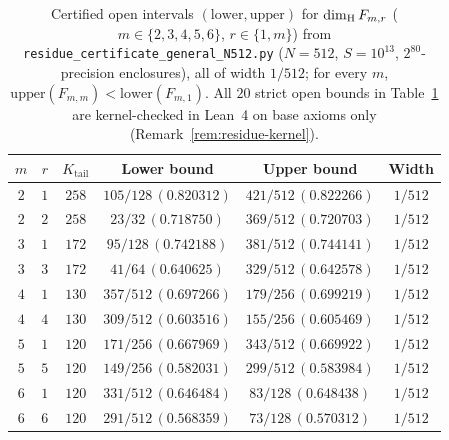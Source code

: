 \begin{table}[ht]
\centering\small
\begin{tabular}{c|c|c|c|c|c}
$m$ & $r$ & $K_{\mathrm{tail}}$ & Lower bound & Upper bound & Width \\\hline
$2$ & $1$ & $258$ & $105/128\,(0.820312)$ & $421/512\,(0.822266)$ & $1/512$ \\
$2$ & $2$ & $258$ & $23/32\,(0.718750)$ & $369/512\,(0.720703)$ & $1/512$ \\\hline
$3$ & $1$ & $172$ & $95/128\,(0.742188)$ & $381/512\,(0.744141)$ & $1/512$ \\
$3$ & $3$ & $172$ & $41/64\,(0.640625)$ & $329/512\,(0.642578)$ & $1/512$ \\\hline
$4$ & $1$ & $130$ & $357/512\,(0.697266)$ & $179/256\,(0.699219)$ & $1/512$ \\
$4$ & $4$ & $130$ & $309/512\,(0.603516)$ & $155/256\,(0.605469)$ & $1/512$ \\\hline
$5$ & $1$ & $120$ & $171/256\,(0.667969)$ & $343/512\,(0.669922)$ & $1/512$ \\
$5$ & $5$ & $120$ & $149/256\,(0.582031)$ & $299/512\,(0.583984)$ & $1/512$ \\\hline
$6$ & $1$ & $120$ & $331/512\,(0.646484)$ & $83/128\,(0.648438)$ & $1/512$ \\
$6$ & $6$ & $120$ & $291/512\,(0.568359)$ & $73/128\,(0.570312)$ & $1/512$
\end{tabular}
\caption{Certified open intervals $(\mathrm{lower},\mathrm{upper})$ for $\dim_{\mathrm{H}} F_{m,r}$ ($m\in\{2,3,4,5,6\}$, $r\in\{1,m\}$) from \texttt{residue\_\allowbreak certificate\_\allowbreak general\_\allowbreak N512.py} ($N=512$, $S=10^{13}$, $2^{80}$-precision enclosures), all of width $1/512$; for every $m$, $\mathrm{upper}(F_{m,m})<\mathrm{lower}(F_{m,1})$. All $20$ strict open bounds in Table~\ref{tab:residues-general} are kernel-checked in Lean~4 on base axioms only (Remark~\ref{rem:residue-kernel}).}\label{tab:residues-general}
\end{table}

